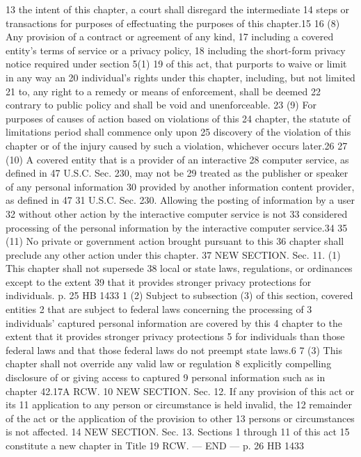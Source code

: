 13 the intent of this chapter, a court shall disregard the intermediate
14 steps or transactions for purposes of effectuating the purposes of
this chapter.15
16 (8) Any provision of a contract or agreement of any kind,
17 including a covered entity's terms of service or a privacy policy,
18 including the short-form privacy notice required under section 5(1)
19 of this act, that purports to waive or limit in any way an
20 individual's rights under this chapter, including, but not limited
21 to, any right to a remedy or means of enforcement, shall be deemed
22 contrary to public policy and shall be void and unenforceable.
23 (9) For purposes of causes of action based on violations of this
24 chapter, the statute of limitations period shall commence only upon
25 discovery of the violation of this chapter or of the injury caused by
such a violation, whichever occurs later.26
27 (10) A covered entity that is a provider of an interactive
28 computer service, as defined in 47 U.S.C. Sec. 230, may not be
29 treated as the publisher or speaker of any personal information
30 provided by another information content provider, as defined in 47
31 U.S.C. Sec. 230. Allowing the posting of information by a user
32 without other action by the interactive computer service is not
33 considered processing of the personal information by the interactive
computer service.34
35 (11) No private or government action brought pursuant to this
36 chapter shall preclude any other action under this chapter.
37 NEW SECTION. Sec. 11. (1) This chapter shall not supersede
38 local or state laws, regulations, or ordinances except to the extent
39 that it provides stronger privacy protections for individuals.
p. 25 HB 1433
1 (2) Subject to subsection (3) of this section, covered entities
2 that are subject to federal laws concerning the processing of
3 individuals' captured personal information are covered by this
4 chapter to the extent that it provides stronger privacy protections
5 for individuals than those federal laws and that those federal laws
do not preempt state laws.6
7 (3) This chapter shall not override any valid law or regulation
8 explicitly compelling disclosure of or giving access to captured
9 personal information such as in chapter 42.17A RCW.
10 NEW SECTION. Sec. 12. If any provision of this act or its
11 application to any person or circumstance is held invalid, the
12 remainder of the act or the application of the provision to other
13 persons or circumstances is not affected.
14 NEW SECTION. Sec. 13. Sections 1 through 11 of this act
15 constitute a new chapter in Title 19 RCW.
--- END ---
p. 26 HB 1433